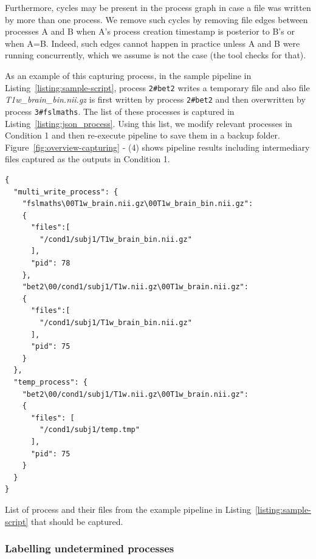 \documentclass[a4paper,num-refs]{oup-contemporary}
\begin{document}
Furthermore, cycles may be present in the process graph in case a file 
was written by more than one process. We remove such cycles by removing 
file edges between processes A and B when A's process creation 
timestamp is posterior to B's or when A=B. Indeed, such edges cannot 
happen in practice unless A and B were running concurrently, which we 
assume is not the case (the tool checks for that). 

As an example of this capturing process, in the sample pipeline in 
Listing~\ref{listing:sample-script}, process \texttt{2\#bet2} writes a temporary file and 
also file \emph{T1w\_brain\_bin.nii.gz} is first written by process \texttt{2\#bet2} and 
then overwritten by process \texttt{3\#fslmaths}. The list of these processes is captured in 
Listing~\ref{listing:json_process}.
Using this list, we modify relevant processes in Condition 1 and then re-execute pipeline 
to save them in a backup folder.
Figure~\ref{fig:overview-capturing} - (4) shows pipeline results including intermediary files 
captured as the outputs in Condition 1. 

\begin{listing}
  \begin{verbatim}
{
  "multi_write_process": {
    "fslmaths\00T1w_brain.nii.gz\00T1w_brain_bin.nii.gz":
    {
      "files":[
        "/cond1/subj1/T1w_brain_bin.nii.gz"
      ],
      "pid": 78
    },
    "bet2\00/cond1/subj1/T1w.nii.gz\00T1w_brain.nii.gz":
    {
      "files":[
        "/cond1/subj1/T1w_brain_bin.nii.gz"
      ],
      "pid": 75
    }
  },
  "temp_process": {
    "bet2\00/cond1/subj1/T1w.nii.gz\00T1w_brain.nii.gz": 
    {
      "files": [
        "/cond1/subj1/temp.tmp"
      ],
      "pid": 75
    } 
  } 
}

\end{verbatim}
\caption{List of process and their files from the example pipeline in 
Listing~\ref{listing:sample-script} that should be captured.}
\label{listing:json_process}
\end{listing}


\subsubsection{Labelling undetermined processes} 
\end{document}
